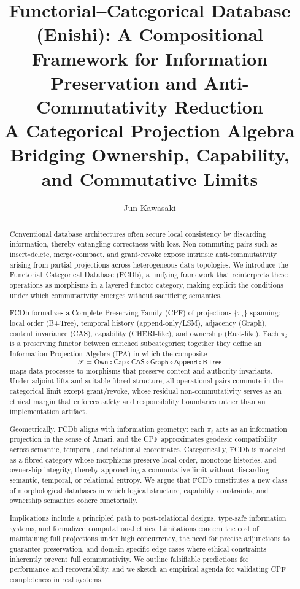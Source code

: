 \documentclass[10pt]{article}
\title{Functorial–Categorical Database (Enishi): A Compositional Framework for Information Preservation and Anti-Commutativity Reduction\\
\large A Categorical Projection Algebra Bridging Ownership, Capability, and Commutative Limits}
\author{Jun Kawasaki}
\date{}
\begin{document}
\maketitle

\begin{abstract}
Conventional database architectures often secure local consistency by discarding information, thereby entangling correctness with loss. Non-commuting pairs such as insert$\circ$delete, merge$\circ$compact, and grant$\circ$revoke expose intrinsic anti-commutativity arising from partial projections across heterogeneous data topologies. We introduce the Functorial--Categorical Database (FCDb), a unifying framework that reinterprets these operations as morphisms in a layered functor category, making explicit the conditions under which commutativity emerges without sacrificing semantics.

FCDb formalizes a Complete Preserving Family (CPF) of projections $\{\pi_i\}$ spanning: local order (B+Tree), temporal history (append-only/LSM), adjacency (Graph), content invariance (CAS), capability (CHERI-like), and ownership (Rust-like). Each $\pi_i$ is a preserving functor between enriched subcategories; together they define an Information Projection Algebra (IPA) in which the composite
\[
\mathcal{F} = \mathsf{Own} \circ \mathsf{Cap} \circ \mathsf{CAS} \circ \mathsf{Graph} \circ \mathsf{Append} \circ \mathsf{BTree}
\]
maps data processes to morphisms that preserve content and authority invariants. Under adjoint lifts and suitable fibred structure, all operational pairs commute in the categorical limit except grant/revoke, whose residual non-commutativity serves as an ethical margin that enforces safety and responsibility boundaries rather than an implementation artifact.

Geometrically, FCDb aligns with information geometry: each $\pi_i$ acts as an information projection in the sense of Amari, and the CPF approximates geodesic compatibility across semantic, temporal, and relational coordinates. Categorically, FCDb is modeled as a fibred category whose morphisms preserve local order, monotone histories, and ownership integrity, thereby approaching a commutative limit without discarding semantic, temporal, or relational entropy. We argue that FCDb constitutes a new class of morphological databases in which logical structure, capability constraints, and ownership semantics cohere functorially.

Implications include a principled path to post-relational designs, type-safe information systems, and formalized computational ethics. Limitations concern the cost of maintaining full projections under high concurrency, the need for precise adjunctions to guarantee preservation, and domain-specific edge cases where ethical constraints inherently prevent full commutativity. We outline falsifiable predictions for performance and recoverability, and we sketch an empirical agenda for validating CPF completeness in real systems.


\end{abstract}
\end{document}

